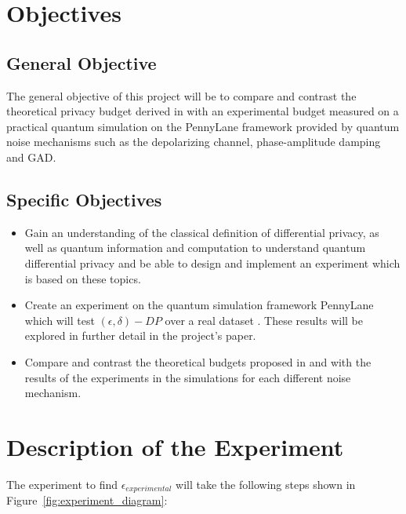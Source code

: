 \documentclass[11pt]{article}
\begin{document}
\section{Objectives}

\subsection{General Objective}

The general objective of this project will be to compare and contrast the theoretical privacy budget derived in \cite{zhou2017differential} with an experimental budget measured on a practical quantum simulation on the PennyLane framework provided by quantum noise mechanisms such as the depolarizing channel, phase-amplitude damping and GAD.

\subsection{Specific Objectives}
\begin{itemize}
    \item Gain an understanding of the classical definition of differential privacy, as well as quantum information and computation to understand quantum differential privacy and be able to design and implement an experiment which is based on these topics.
    \item Create an experiment on the quantum simulation framework PennyLane which will test $(\epsilon, \delta)-DP$ over a real dataset \cite{hofmann1994german}. These results will be explored in further detail in the project's paper.
    \item Compare and contrast the theoretical budgets proposed in \cite{zhou2017differential} and \cite{song2025hybrid} with the results of the experiments in the simulations for each different noise mechanism.
\end{itemize}

\section{Description of the Experiment}

The experiment to find $\epsilon_{experimental}$ will take the following steps shown in Figure~\ref{fig:experiment_diagram}:
\end{document}
